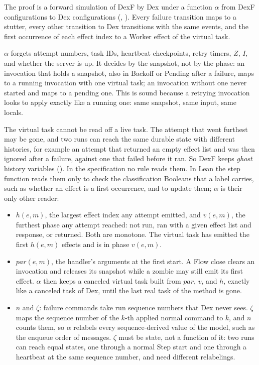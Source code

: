 The proof is a forward simulation of DexF by Dex under a function
$\alpha$ from DexF configurations to Dex configurations
(, ). Every failure
transition maps to a stutter, every other transition to Dex transitions
with the same events, and the first occurrence of each effect index to a
Worker effect of the virtual task.

$\alpha$ forgets attempt numbers, task IDs, heartbeat checkpoints, retry
timers, $Z$, $I$, and whether the server is up. It decides by the snapshot,
not by the phase: an invocation that holds a snapshot, also in Backoff or
Pending after a failure, maps to a running invocation with one virtual
task; an invocation without one never started and maps to a pending one.
This is sound because a retrying invocation looks to apply exactly like a
running one: same snapshot, same input, same locals.

The virtual task cannot be read off a live task. The attempt that went
furthest may be gone, and two runs can reach the same durable state with
different histories, for example an attempt that returned an empty effect
list and was then ignored after a failure, against one that failed before
it ran. So DexF keeps \emph{ghost} history variables (). In
the specification no rule reads them. In Lean the step function reads them
only to check the classification Booleans that a label carries, such as
whether an effect is a first occurrence, and to update them; $\alpha$ is
their only other reader:
\begin{itemize}
\item $h(e, m)$, the largest effect index any attempt emitted, and
  $v(e, m)$, the furthest phase any attempt reached: not run, ran with a
  given effect list and response, or returned. Both are monotone. The
  virtual task has emitted the first $h(e, m)$ effects and is in phase
  $v(e, m)$.
\item $\mathit{par}(e, m)$, the handler's arguments at the first start. A
  Flow close clears an invocation and releases its snapshot while a zombie
  may still emit its first effect. $\alpha$ then keeps a canceled virtual
  task built from $\mathit{par}$, $v$, and $h$, exactly like a canceled task
  of Dex, until the last real task of the method is gone.
\item $n$ and $\zeta$: failure commands take run sequence numbers that Dex
  never sees. $\zeta$ maps the sequence number of the $k$-th applied normal
  command to $k$, and $n$ counts them, so $\alpha$ relabels every
  sequence-derived value of the model, such as the enqueue order of
  messages. $\zeta$ must be state, not a function of it: two runs can reach
  equal states, one through a normal Step start and one through a
  heartbeat at the same sequence number, and need different relabelings.
\end{itemize}

